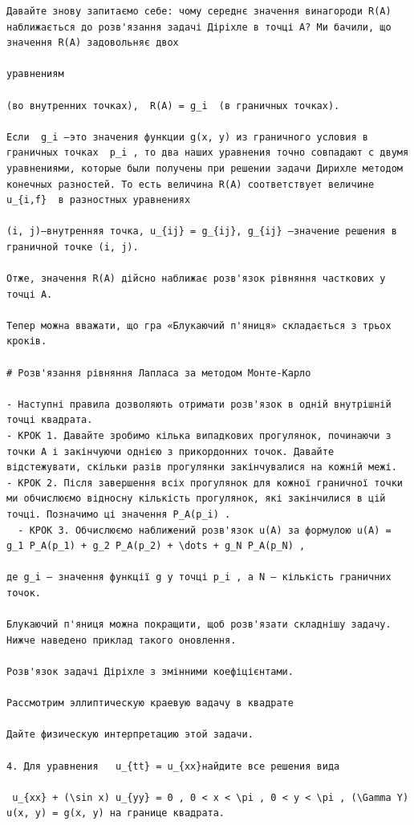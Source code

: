 \documentclass[
  ukrainian,
]{article}
\begin{document}
\begin{verbatim}
Давайте знову запитаємо себе: чому середнє значення винагороди R(A) наближається до розв'язання задачі Діріхле в точці A? Ми бачили, що значення R(A) задовольняє двох

уравнениям

(во внутренних точках),  R(A) = g_i  (в граничных точках).

Если  g_i —это значения функции g(x, y) из граничного условия в граничных точках  p_i , то два наших уравнения точно совпадают с двумя уравнениями, которые были получены при решении задачи Дирихле методом конечных разностей. То есть величина R(A) соответствует величине  u_{i,f}  в разностных уравнениях

(i, j)—внутренняя точка, u_{ij} = g_{ij}, g_{ij} —значение решения в граничной точке (i, j).

Отже, значення R(A) дійсно наближає розв'язок рівняння часткових у точці A.

Тепер можна вважати, що гра «Блукаючий п'яниця» складається з трьох кроків.

# Розв'язання рівняння Лапласа за методом Монте-Карло

- Наступні правила дозволяють отримати розв'язок в одній внутрішній точці квадрата.
- КРОК 1. Давайте зробимо кілька випадкових прогулянок, починаючи з точки A і закінчуючи однією з прикордонних точок. Давайте відстежувати, скільки разів прогулянки закінчувалися на кожній межі.
- КРОК 2. Після завершення всіх прогулянок для кожної граничної точки ми обчислюємо відносну кількість прогулянок, які закінчилися в цій точці. Позначимо ці значення P_A(p_i) .
  - КРОК 3. Обчислюємо наближений розв'язок u(A) за формулою u(A) = g_1 P_A(p_1) + g_2 P_A(p_2) + \dots + g_N P_A(p_N) ,

де g_i — значення функції g у точці p_i , а N — кількість граничних точок.

Блукаючий п'яниця можна покращити, щоб розв'язати складнішу задачу. Нижче наведено приклад такого оновлення.

Розв'язок задачі Діріхле з змінними коефіцієнтами.

Рассмотрим эллиптическую краевую вадачу в квадрате

Дайте физическую интерпретацию этой задачи.

4. Для уравнения   u_{tt} = u_{xx}найдите все решения вида

 u_{xx} + (\sin x) u_{yy} = 0 , 0 < x < \pi , 0 < y < \pi , (\Gamma Y) u(x, y) = g(x, y) на границе квадрата.


\end{verbatim}
\end{document}

